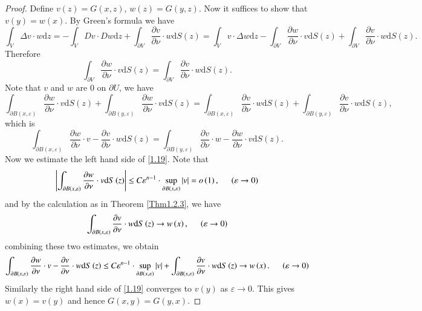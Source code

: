 \begin{proof}
Define $v(z)=G(x,z)$, $w(z)=G(y,z)$. Now it suffices to show that $v(y)=w(x)$. By Green's formula we have 
$$
\int_V{\Delta v\cdot w\mathrm{d}z}=-\int_V{Dv\cdot Dw\mathrm{d}z}+\int_{\partial V}{\frac{\partial v}{\partial \nu}\cdot w\mathrm{d}S\left( z \right)}=\int_V{v\cdot \Delta w\mathrm{d}z}-\int_{\partial V}{\frac{\partial w}{\partial \nu}\cdot v\mathrm{d}S\left( z \right)}+\int_{\partial V}{\frac{\partial v}{\partial \nu}\cdot w\mathrm{d}S\left( z \right)}.
$$
Therefore 
$$
\int_{\partial V}{\frac{\partial w}{\partial \nu}\cdot v\mathrm{d}S\left( z \right)}=\int_{\partial V}{\frac{\partial v}{\partial \nu}\cdot w\mathrm{d}S\left( z \right)}.
$$
Note that $v$ and $w$ are $0$ on $\partial U$, we have 
$$
\int_{\partial B\left( x,\varepsilon \right)}{\frac{\partial w}{\partial \nu}\cdot v\mathrm{d}S\left( z \right)}+\int_{\partial B\left( y,\varepsilon \right)}{\frac{\partial w}{\partial \nu}\cdot v\mathrm{d}S\left( z \right)}=\int_{\partial B\left( x,\varepsilon \right)}{\frac{\partial v}{\partial \nu}\cdot w\mathrm{d}S\left( z \right)}+\int_{\partial B\left( y,\varepsilon \right)}{\frac{\partial v}{\partial \nu}\cdot w\mathrm{d}S\left( z \right)},
$$
which is 
\begin{equation}\label{1.19}
\int_{\partial B\left( x,\varepsilon \right)}{\frac{\partial w}{\partial \nu}\cdot v-\frac{\partial v}{\partial \nu}\cdot w\mathrm{d}S\left( z \right)}=\int_{\partial B\left( y,\varepsilon \right)}{\frac{\partial v}{\partial \nu}\cdot w-\frac{\partial w}{\partial \nu}\cdot v\mathrm{d}S\left( z \right)}.
\end{equation}
Now we estimate the left hand side of \eqref{1.19}. Note that 
$$
\left| \int_{\partial B\left( x,\varepsilon \right)}{\frac{\partial w}{\partial \nu}\cdot v\mathrm{d}S\left( z \right)} \right|\le C\varepsilon ^{n-1}\cdot \mathop {\mathrm{sup}} \limits_{\partial B\left( x,\varepsilon \right)}\left| v \right|=o\left( 1 \right) ,\hspace{0.5cm}\left( \varepsilon \rightarrow 0 \right) 
$$
and by the calculation as in Theorem \ref{Thm1.2.3}, we have 
$$
\int_{\partial B\left( x,\varepsilon \right)}{\frac{\partial v}{\partial \nu}\cdot w\mathrm{d}S\left( z \right)}\rightarrow w\left( x \right) ,\hspace{0.5cm}\left( \varepsilon \rightarrow 0 \right) 
$$
combining these two estimates, we obtain 
$$
\int_{\partial B\left( x,\varepsilon \right)}{\frac{\partial w}{\partial \nu}\cdot v-\frac{\partial v}{\partial \nu}\cdot w\mathrm{d}S\left( z \right)}\le C\varepsilon ^{n-1}\cdot \mathop {\mathrm{sup}} \limits_{\partial B\left( x,\varepsilon \right)}\left| v \right|+\int_{\partial B\left( x,\varepsilon \right)}{\frac{\partial v}{\partial \nu}\cdot w\mathrm{d}S\left( z \right)}\rightarrow w\left( x \right) .\hspace{0.5cm}\left( \varepsilon \rightarrow 0 \right) 
$$
Similarly the right hand side of \eqref{1.19} converges to $v(y)$ as $\varepsilon\to 0$. This gives $w(x)=v(y)$ and hence $G(x,y)=G(y,x)$.
\end{proof}
